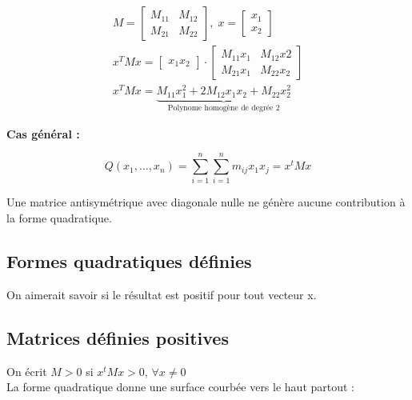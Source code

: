 \documentclass[document.tex]{subfiles}
\begin{document}
\begin{equation}
\begin{array}{c}
M = \begin{bmatrix} M_{11} & M_{12} \\ M_{21} & M_{22} \end{bmatrix}, \; x = \begin{bmatrix}
x_1 \\ x_2 \end{bmatrix} \\[24pt]
x^T M x = \begin{bmatrix} x_1 x_2 \end{bmatrix} \cdot \begin{bmatrix} M_{11} x_1 & M_{12} x2 \\ M_{21} x_1 & M_{22} x_2 \end{bmatrix} \\[24pt]
x^T M x =\underbrace{M_{11} x_1^2 + 2 M_{12}x_1 x_2 + M_{22} x_2^2}_{\text{Polynome homogène de degrée 2}}
\end{array}
\end{equation}

\textbf{Cas général :}

\begin{equation}
Q(x_1,\ldots,x_n)=\sum_{i=1}^n \sum_{i=1}^n m_{i j}x_1 x_j = x^t M x
\end{equation}

Une matrice antisymétrique avec diagonale nulle ne génère aucune contribution à la forme quadratique.


\subsection{Formes quadratiques définies}


On aimerait savoir si le résultat est positif pour tout vecteur x.


\subsection{Matrices définies positives}

On écrit  $M > 0$  si  $x^t M x>0$, $ \forall x \neq 0$ \\

La forme quadratique donne une surface courbée vers le haut partout :

\end{document}
